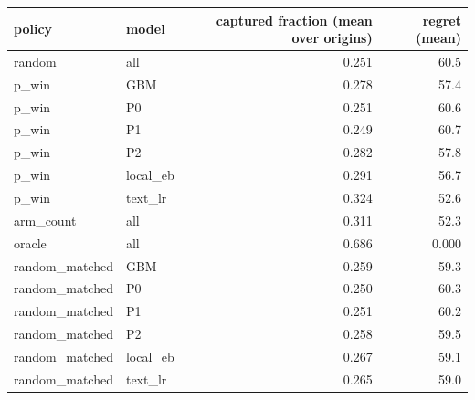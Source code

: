 \begin{tabular}{llrr}
\toprule
policy & model & captured fraction (mean over origins) & regret (mean) \\
\midrule
random & all & 0.251 & 60.5 \\
p\_win & GBM & 0.278 & 57.4 \\
p\_win & P0 & 0.251 & 60.6 \\
p\_win & P1 & 0.249 & 60.7 \\
p\_win & P2 & 0.282 & 57.8 \\
p\_win & local\_eb & 0.291 & 56.7 \\
p\_win & text\_lr & 0.324 & 52.6 \\
arm\_count & all & 0.311 & 52.3 \\
oracle & all & 0.686 & 0.000 \\
random\_matched & GBM & 0.259 & 59.3 \\
random\_matched & P0 & 0.250 & 60.3 \\
random\_matched & P1 & 0.251 & 60.2 \\
random\_matched & P2 & 0.258 & 59.5 \\
random\_matched & local\_eb & 0.267 & 59.1 \\
random\_matched & text\_lr & 0.265 & 59.0 \\
\bottomrule
\end{tabular}
